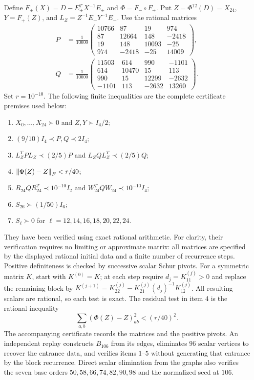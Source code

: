 Define $F_\pm(X)=D-E_\pm^TX^{-1}E_\pm$ and
$\Phi=F_-\circ F_+$. Put $Z=\Phi^{12}(D)=X_{24}$,
$Y=F_+(Z)$, and $L_Z=Z^{-1}E_+Y^{-1}E_-$. Use the rational matrices
\begin{align*}
 P&=\frac1{10000}\begin{pmatrix}
10766&87&19&974\\87&12664&148&-2418\\19&148&10093&-25\\974&-2418&-25&14009
\end{pmatrix},\\
 Q&=\frac1{10000}\begin{pmatrix}
11503&614&990&-1101\\614&10470&15&113\\990&15&12299&-2632\\-1101&113&-2632&13260
\end{pmatrix}.
\end{align*}
Set $r=10^{-10}$. The following finite inequalities are the complete
certificate premises used below:
\begin{enumerate}
\item $X_0,\ldots,X_{24}\succ0$ and $Z,Y\succ I_4/2$;
\item $(9/10)I_4\prec P,Q\prec2I_4$;
\item $L_Z^TPL_Z\prec(2/5)P$ and $L_ZQL_Z^T\prec(2/5)Q$;
\item $\left\lVert\Phi(Z)-Z\right\rVert_F<r/40$;
\item $R_{24}QR_{24}^T\prec10^{-10}I_2$ and
$W_{24}^TQW_{24}\prec10^{-10}I_4$;
\item $S_{26}\succ(1/50)I_6$;
\item $S_\ell\succ0$ for $\ell=12,14,16,18,20,22,24$.
\end{enumerate}
They have been verified using exact rational arithmetic. For clarity, their
verification requires no limiting or approximate matrix: all matrices are
specified by the displayed rational initial data and a finite number of
recurrence steps. Positive definiteness is checked by successive scalar
Schur pivots. For a symmetric matrix $K$, start with $K^{(0)}=K$; at each
step require $d_j=K^{(j)}_{11}>0$ and replace the remaining block by
$K^{(j+1)}=K^{(j)}_{22}-K^{(j)}_{21}(d_j)^{-1}K^{(j)}_{12}$.
All resulting scalars are rational, so each test is exact. The residual
test in item 4 is the rational inequality
\[
 \sum_{a,b}(\Phi(Z)-Z)_{ab}^2<(r/40)^2.
\]
The accompanying certificate records the matrices and the positive pivots.
An independent replay constructs $B_{106}$ from its edges, eliminates
$96$ scalar vertices to recover the entrance data, and verifies items
1--5 without generating that entrance by the block recurrence. Direct
scalar elimination from the graphs also verifies the seven base orders
$50,58,66,74,82,90,98$ and the normalized seed at $106$.


